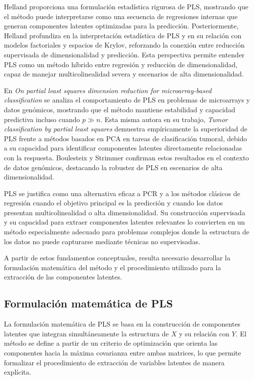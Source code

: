 \documentclass[12pt,a4paper]{report}
\begin{document}
Helland \cite{helland1988} proporciona una formulación estadística rigurosa de PLS, mostrando que el método puede interpretarse como una secuencia de regresiones internas que generan componentes latentes optimizadas para la predicción. Posteriormente, Helland \cite{helland1990} profundiza en la interpretación estadística de PLS y en su relación con modelos factoriales y espacios de Krylov, reforzando la conexión entre reducción supervisada de dimensionalidad y predicción. Esta perspectiva permite entender PLS como un método híbrido entre regresión y reducción de dimensionalidad, capaz de manejar multicolinealidad severa y escenarios de alta dimensionalidad.

En \textit{On partial least squares dimension reduction for microarray-based classification} \cite{nguyen2004} se analiza el comportamiento de PLS en problemas de microarrays y datos genómicos, mostrando que el método mantiene estabilidad y capacidad predictiva incluso cuando \(p \gg n\). Esta misma autora en su trabajo, \textit{Tumor classification by partial least squares} \cite{nguyen2002} demuestra empíricamente la superioridad de PLS frente a métodos basados en PCA en tareas de clasificación tumoral, debido a su capacidad para identificar componentes latentes directamente relacionadas con la respuesta. Boulesteix y Strimmer \cite{boulesteix2007} confirman estos resultados en el contexto de datos genómicos, destacando la robustez de PLS en escenarios de alta dimensionalidad.

PLS se justifica como una alternativa eficaz a PCR y a los métodos clásicos de regresión cuando el objetivo principal es la predicción y cuando los datos presentan multicolinealidad o alta dimensionalidad. Su construcción supervisada y su capacidad para extraer componentes latentes relevantes lo convierten en un método especialmente adecuado para problemas complejos donde la estructura de los datos no puede capturarse mediante técnicas no supervisadas.

A partir de estos fundamentos conceptuales, resulta necesario desarrollar la formulación matemática del método y el procedimiento utilizado para la extracción de las componentes latentes.

\subsection{Formulación matemática de PLS}

La formulación matemática de PLS se basa en la construcción de componentes latentes que integran simultáneamente la estructura de \(X\) y su relación con \(Y\). El método se define a partir de un criterio de optimización que orienta las componentes hacia la máxima covarianza entre ambas matrices, lo que permite formalizar el procedimiento de extracción de variables latentes de manera explícita.
\end{document}
